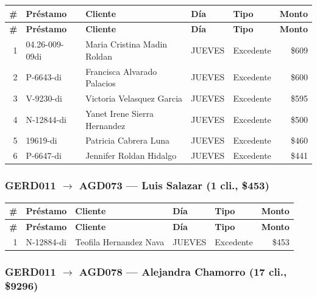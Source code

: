 \documentclass[11pt,a4paper]{article}
\newcommand{\money}[1]{\$\num{#1}}
\begin{document}
\begin{center}
\renewcommand{\arraystretch}{1.1}
\footnotesize
\begin{longtable}{rlp{5.5cm}llr}
\toprule
\textbf{\#} & \textbf{Pr\'estamo} & \textbf{Cliente} & \textbf{D\'ia} & \textbf{Tipo} & \textbf{Monto} \\
\midrule
\endfirsthead
\toprule
\textbf{\#} & \textbf{Pr\'estamo} & \textbf{Cliente} & \textbf{D\'ia} & \textbf{Tipo} & \textbf{Monto} \\
\midrule
\endhead
1 & 04.26-009-09di & Maria Cristina Madin Roldan & JUEVES & Excedente & \money{609} \\
2 & P-6643-di & Francisca Alvarado Palacios & JUEVES & Excedente & \money{600} \\
3 & V-9230-di & Victoria Velasquez Garcia & JUEVES & Excedente & \money{595} \\
4 & N-12844-di & Yanet Irene Sierra Hernandez & JUEVES & Excedente & \money{500} \\
5 & 19619-di & Patricia Cabrera Luna & JUEVES & Excedente & \money{460} \\
6 & P-6647-di & Jennifer Roldan Hidalgo & JUEVES & Excedente & \money{441} \\

\bottomrule
\end{longtable}
\end{center}
\subsubsection{GERD011 $\rightarrow$ AGD073 --- Luis Salazar (1 cli., \money{453})}


\begin{center}
\renewcommand{\arraystretch}{1.1}
\footnotesize
\begin{longtable}{rlp{5.5cm}llr}
\toprule
\textbf{\#} & \textbf{Pr\'estamo} & \textbf{Cliente} & \textbf{D\'ia} & \textbf{Tipo} & \textbf{Monto} \\
\midrule
\endfirsthead
\toprule
\textbf{\#} & \textbf{Pr\'estamo} & \textbf{Cliente} & \textbf{D\'ia} & \textbf{Tipo} & \textbf{Monto} \\
\midrule
\endhead
1 & N-12884-di & Teofila Hernandez Nava & JUEVES & Excedente & \money{453} \\

\bottomrule
\end{longtable}
\end{center}
\subsubsection{GERD011 $\rightarrow$ AGD078 --- Alejandra Chamorro (17 cli., \money{9296})}
\end{document}
